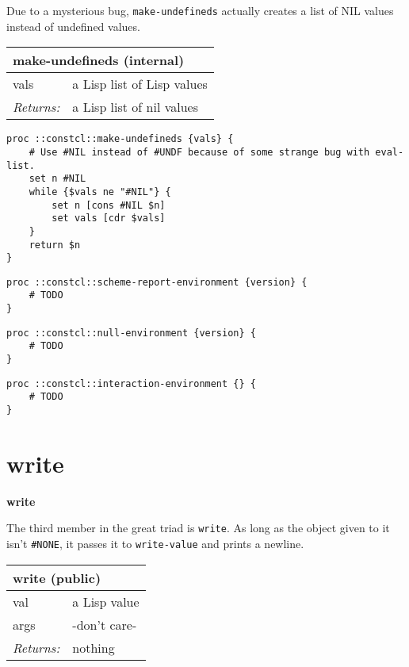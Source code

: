\documentclass{report}
\begin{document}
Due to a mysterious bug, \texttt{make-undefineds} actually creates a list of NIL values instead of undefined values.

\begin{tabular}{ |l l| }
\hline
\multicolumn{2}{|l|}{make-undefineds (internal)} \\
\hline
vals & a Lisp list of Lisp values \\
\textit{Returns:} & a Lisp list of nil values \\
\hline
\end{tabular}

\noindent\makebox[\linewidth]{\rule{\linewidth}{0.4pt}}
\begin{lstlisting}
proc ::constcl::make-undefineds {vals} {
    # Use #NIL instead of #UNDF because of some strange bug with eval-list.
    set n #NIL
    while {$vals ne "#NIL"} {
        set n [cons #NIL $n]
        set vals [cdr $vals]
    }
    return $n
}
\end{lstlisting}
\noindent\makebox[\linewidth]{\rule{\linewidth}{0.4pt}}
\noindent\makebox[\linewidth]{\rule{\linewidth}{0.4pt}}
\begin{lstlisting}
proc ::constcl::scheme-report-environment {version} {
    # TODO
}
\end{lstlisting}
\noindent\makebox[\linewidth]{\rule{\linewidth}{0.4pt}}
\noindent\makebox[\linewidth]{\rule{\linewidth}{0.4pt}}
\begin{lstlisting}
proc ::constcl::null-environment {version} {
    # TODO
}
\end{lstlisting}
\noindent\makebox[\linewidth]{\rule{\linewidth}{0.4pt}}
\noindent\makebox[\linewidth]{\rule{\linewidth}{0.4pt}}
\begin{lstlisting}
proc ::constcl::interaction-environment {} {
    # TODO
}
\end{lstlisting}
\noindent\makebox[\linewidth]{\rule{\linewidth}{0.4pt}}
\section{write}
\label{write}

\textbf{write}


The third member in the great triad is \texttt{write}. As long as the object given to it isn't \texttt{\#NONE}, it passes it to \texttt{write-value} and prints a newline.

\begin{tabular}{ |l l| }
\hline
\multicolumn{2}{|l|}{write (public)} \\
\hline
val & a Lisp value \\
args & -don't care- \\
\textit{Returns:} & nothing \\
\hline
\end{tabular}
\end{document}

